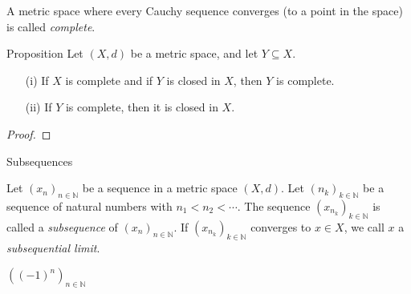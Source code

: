 \documentclass [aspectratio=169]{beamer}
\newcommand{\N}{{\mathbb{N}}}
\begin{document}
\begin{frame}
\begin{definition}
A metric space where every Cauchy sequence converges (to a point in the space) is called \emph{complete}.
\end{definition}
\vspace{1cm}

\begin{exampleblock}{Proposition}
Let $(X, d)$ be a metric space, and let $Y\subseteq X$.
\begin{enumerate}
    \item[(i)] If $X$ is complete and if $Y$ is closed in $X$, then $Y$ is complete.
    \item[(ii)] If $Y$ is complete, then it is closed in $X$.
\end{enumerate}
\end{exampleblock}

\end{frame}


\begin{frame}
\begin{proof}
\vspace{5cm}
\end{proof}
\end{frame}


\begin{frame}{Subsequences}
\begin{definition}
Let $(x_n)_{n \in \N}$ be a sequence in a metric space $(X,d)$. Let $(n_k)_{k \in \N}$ be a sequence of natural numbers with $n_1 < n_2 < \cdots$. The sequence $(x_{n_k})_{k \in \N}$ is called a \emph{subsequence} of $(x_n)_{n \in \N}$. If $(x_{n_k})_{k \in \N}$ converges to $x \in X$, we call $x$ a \emph{subsequential limit}.
\end{definition}

\vspace{0.5cm}

\begin{example}
$\left((-1)^n\right)_{n \in \N}$ 

\vspace{2cm}

\end{example}

\end{frame}
\end{document}
